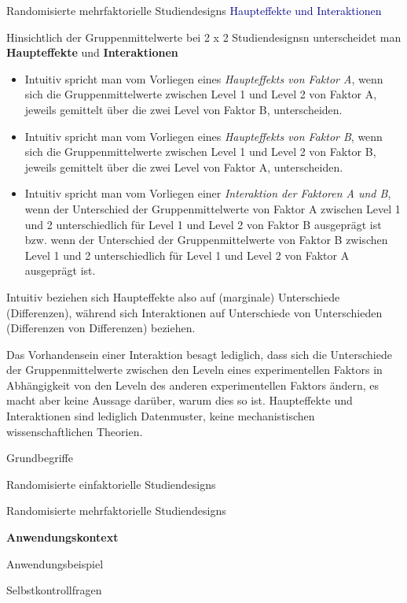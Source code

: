 \documentclass[
  8pt,
  ignorenonframetext,
]{beamer}
\begin{document}
\begin{frame}{Randomisierte mehrfaktorielle Studiendesigns}
\protect\hypertarget{randomisierte-mehrfaktorielle-studiendesigns-6}{}
\textcolor{darkblue}{Haupteffekte und Interaktionen}

\footnotesize
\justifying

Hinsichtlich der Gruppenmittelwerte bei 2 x 2 Studiendesignsn
unterscheidet man \textbf{Haupteffekte} und \textbf{Interaktionen}

\begin{itemize}
\item
  Intuitiv spricht man vom Vorliegen eines
  \textit{Haupteffekts von Faktor A}, wenn sich die Gruppenmittelwerte
  zwischen Level 1 und Level 2 von Faktor A, jeweils gemittelt über die
  zwei Level von Faktor B, unterscheiden.
\item
  Intuitiv spricht man vom Vorliegen eines
  \textit{Haupteffekts von Faktor B}, wenn sich die Gruppenmittelwerte
  zwischen Level 1 und Level 2 von Faktor B, jeweils gemittelt über die
  zwei Level von Faktor A, unterscheiden.
\item
  Intuitiv spricht man vom Vorliegen einer
  \textit{Interaktion der Faktoren A
  und B}, wenn der Unterschied der Gruppenmittelwerte von Faktor A
  zwischen Level 1 und 2 unterschiedlich für Level 1 und Level 2 von
  Faktor B ausgeprägt ist bzw. wenn der Unterschied der
  Gruppenmittelwerte von Faktor B zwischen Level 1 und 2 unterschiedlich
  für Level 1 und Level 2 von Faktor A ausgeprägt ist.
\end{itemize}

Intuitiv beziehen sich Haupteffekte also auf (marginale) Unterschiede
(Differenzen), während sich Interaktionen auf Unterschiede von
Unterschieden (Differenzen von Differenzen) beziehen.

Das Vorhandensein einer Interaktion besagt lediglich, dass sich die
Unterschiede der Gruppenmittelwerte zwischen den Leveln eines
experimentellen Faktors in Abhängigkeit von den Leveln des anderen
experimentellen Faktors ändern, es macht aber keine Aussage darüber,
warum dies so ist. Haupteffekte und Interaktionen sind lediglich
Datenmuster, keine mechanistischen wissenschaftlichen Theorien.
\end{frame}

\begin{frame}[plain]{}
\protect\hypertarget{section-6}{}
\vfill
\large
{}

Grundbegriffe

Randomisierte einfaktorielle Studiendesigns

Randomisierte mehrfaktorielle Studiendesigns

\textbf{Anwendungskontext}

Anwendungsbeispiel

Selbstkontrollfragen \vfill
\end{frame}
\end{document}
